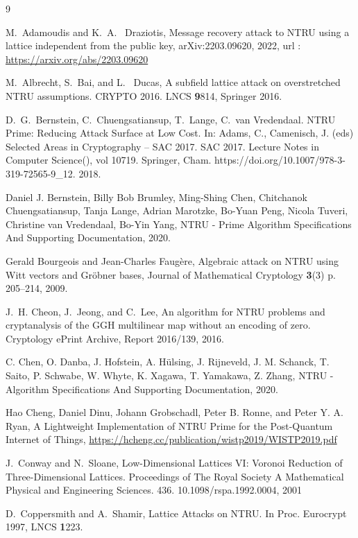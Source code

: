 \documentclass{amsart}
\numberwithin{equation}{section}
\begin{document}
	\begin{thebibliography}{9}
	
 M.~Adamoudis and K.~A.~ Draziotis, Message recovery attack to NTRU using a lattice independent from the public key, arXiv:2203.09620, 2022, url : \url{https://arxiv.org/abs/2203.09620}


 M.~Albrecht, S.~Bai, and L.~ Ducas, A subfield lattice attack on overstretched NTRU assumptions. CRYPTO 2016. LNCS {\textbf 9814}, Springer 2016.


 D.~G.~Bernstein, C.~Chuengsatiansup, T.~Lange, C.~van Vredendaal. NTRU Prime: Reducing Attack Surface at Low Cost. In: Adams, C., Camenisch, J. (eds) Selected Areas in Cryptography – SAC 2017. SAC 2017. Lecture Notes in Computer Science(), vol 10719. Springer, Cham. https://doi.org/10.1007/978-3-319-72565-9\_12. 2018.

 Daniel J. Bernstein, Billy Bob Brumley,  Ming-Shing Chen, Chitchanok Chuengsatiansup, Tanja Lange, Adrian Marotzke,  Bo-Yuan Peng, Nicola Tuveri, Christine van Vredendaal, Bo-Yin Yang, NTRU - Prime Algorithm Specifications And Supporting Documentation, 2020.

 Gerald Bourgeois and Jean-Charles Faugère, Algebraic attack on NTRU using Witt vectors and Gröbner bases, Journal of Mathematical Cryptology {\textbf 3(3)} p. 205--214, 2009.

 J.~H. Cheon, J.~Jeong, and C.~Lee, An algorithm for NTRU problems and cryptanalysis of the GGH multilinear map without an encoding of zero. Cryptology ePrint Archive, Report 2016/139, 2016. 
		
 C. Chen, O. Danba, J.  Hofstein, A. Hülsing, J. Rijneveld, J. M. Schanck, T. Saito, P. Schwabe, W. Whyte, K. Xagawa, T. Yamakawa, Z. Zhang, NTRU - Algorithm Specifications And Supporting Documentation, 2020.

 Hao Cheng, Daniel Dinu, Johann Grobschadl, Peter B. Ronne, and Peter Y. A. Ryan, A Lightweight Implementation of NTRU Prime for the Post-Quantum Internet of Things, \url{https://hcheng.cc/publication/wistp2019/WISTP2019.pdf}

 J.~Conway and N.~Sloane, Low-Dimensional Lattices VI: Voronoi Reduction of Three-Dimensional Lattices. Proceedings of The Royal Society A Mathematical Physical and Engineering Sciences. 436. 10.1098/rspa.1992.0004, 2001

  D.~Coppersmith  and  A.~Shamir,  Lattice  Attacks  on  NTRU.  In  Proc.  Eurocrypt  1997, LNCS {\textbf 1223}. 


\end{thebibliography}
\end{document}
